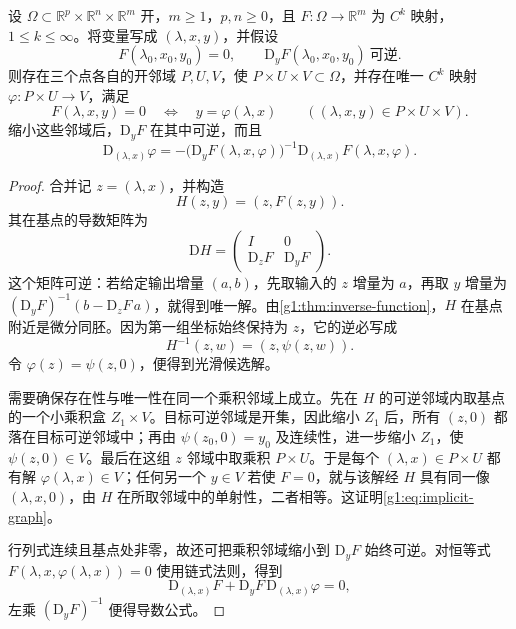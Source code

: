 \begin{theorem}[带参数的隐函数定理]
	\label{g1:thm:implicit-function-parameters}
	设 \(\Omega\subset\mathbb R^p\times\mathbb R^n\times\mathbb R^m\) 开，\(m\geq1\)，\(p,n\geq0\)，且 \(F:\Omega\to\mathbb R^m\) 为 \(C^k\) 映射，\(1\leq k\leq\infty\)。将变量写成 \((\lambda,x,y)\)，并假设
	\[
		F(\lambda_0,x_0,y_0)=0,\qquad \mathrm{D}_yF(\lambda_0,x_0,y_0)\ \text{可逆}.
	\]
	则存在三个点各自的开邻域 \(P,U,V\)，使 \(P\times U\times V\subset\Omega\)，并存在唯一 \(C^k\) 映射 \(\varphi:P\times U\to V\)，满足
	\begin{equation}
		\label{g1:eq:implicit-graph}
		F(\lambda,x,y)=0
		\quad\Longleftrightarrow\quad
		y=\varphi(\lambda,x)
		\qquad((\lambda,x,y)\in P\times U\times V).
	\end{equation}
	缩小这些邻域后，\(\mathrm{D}_yF\) 在其中可逆，而且
	\begin{equation}
		\label{g1:eq:implicit-derivative}
		\mathrm{D}_{(\lambda,x)}\varphi
		=-\bigl(\mathrm{D}_yF(\lambda,x,\varphi)\bigr)^{-1}
		\mathrm{D}_{(\lambda,x)}F(\lambda,x,\varphi).
	\end{equation}
\end{theorem}
\begin{proof}
	合并记 \(z=(\lambda,x)\)，并构造
	\[
		H(z,y)=(z,F(z,y)).
	\]
	其在基点的导数矩阵为
	\[
		\mathrm{D}H=\begin{pmatrix}I&0\\\mathrm{D}_zF&\mathrm{D}_yF\end{pmatrix}.
	\]
	这个矩阵可逆：若给定输出增量 \((a,b)\)，先取输入的 \(z\) 增量为 \(a\)，再取 \(y\) 增量为 \((\mathrm{D}_yF)^{-1}(b-\mathrm{D}_zF\,a)\)，就得到唯一解。由\cref{g1:thm:inverse-function}，\(H\) 在基点附近是微分同胚。因为第一组坐标始终保持为 \(z\)，它的逆必写成
	\[
		H^{-1}(z,w)=(z,\psi(z,w)).
	\]
	令 \(\varphi(z)=\psi(z,0)\)，便得到光滑候选解。

	需要确保存在性与唯一性在同一个乘积邻域上成立。先在 \(H\) 的可逆邻域内取基点的一个小乘积盒 \(Z_1\times V\)。目标可逆邻域是开集，因此缩小 \(Z_1\) 后，所有 \((z,0)\) 都落在目标可逆邻域中；再由 \(\psi(z_0,0)=y_0\) 及连续性，进一步缩小 \(Z_1\)，使 \(\psi(z,0)\in V\)。最后在这组 \(z\) 邻域中取乘积 \(P\times U\)。于是每个 \((\lambda,x)\in P\times U\) 都有解 \(\varphi(\lambda,x)\in V\)；任何另一个 \(y\in V\) 若使 \(F=0\)，就与该解经 \(H\) 具有同一像 \((\lambda,x,0)\)，由 \(H\) 在所取邻域中的单射性，二者相等。这证明\eqref{g1:eq:implicit-graph}。

	行列式连续且基点处非零，故还可把乘积邻域缩小到 \(\mathrm{D}_yF\) 始终可逆。对恒等式 \(F(\lambda,x,\varphi(\lambda,x))=0\) 使用链式法则，得到
	\[
		\mathrm{D}_{(\lambda,x)}F+\mathrm{D}_yF\,\mathrm{D}_{(\lambda,x)}\varphi=0,
	\]
	左乘 \((\mathrm{D}_yF)^{-1}\) 便得导数公式。
\end{proof}

